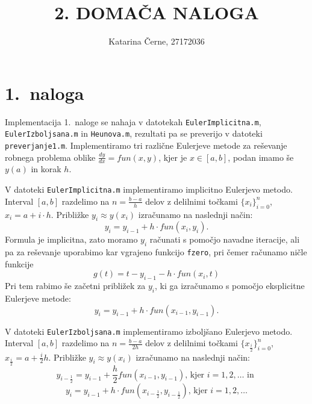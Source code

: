 \documentclass[a4paper,12pt]{article}
\begin{document}
\title{2. DOMAČA NALOGA}
\author{Katarina Černe, 27172036}
\maketitle

\section*{1.\ naloga}

Implementacija 1.\ naloge se nahaja v datotekah \texttt{EulerImplicitna.m}, \texttt{EulerIzboljsana.m} in \texttt{Heunova.m}, rezultati pa se preverijo v datoteki \texttt{preverjanje1.m}.
Implementiramo tri različne Eulerjeve metode za reševanje robnega problema oblike 
\(\frac{dy}{dx}=fun(x,y)\), kjer je \(x\in [a,b]\), podan imamo še \(y(a)\) in korak \(h\).

V datoteki \texttt{EulerImplicitna.m} implementiramo implicitno Eulerjevo metodo.
Interval \([a,b]\) razdelimo na \(n=\frac{b-a}{h}\) delov z delilnimi
točkami \(\{x_i\}_{i=0}^{n}\), \(x_i=a+i\cdot h\). Približke \(y_i\approx y(x_i)\)
izračunamo na naslednji način: 
\[y_i=y_{i-1}+h\cdot fun(x_i,y_i).\]
Formula je implicitna, zato moramo $y_i$ računati s pomočjo navadne
iteracije, ali pa za reševanje uporabimo kar vgrajeno funkcijo \texttt{fzero},
pri čemer računamo ničle funkcije 
$$g(t)=t-y_{i-1}-h\cdot fun(x_i,t)$$
Pri tem rabimo še začetni približek za $y_i$, ki ga
izračunamo s pomočjo eksplicitne Eulerjeve metode:
$$y_i=y_{i-1}+h\cdot fun(x_{i-1},y_{i-1}).$$

V datoteki \texttt{EulerIzboljsana.m} implementiramo izboljšano
Eulerjevo metodo. Interval $[a,b]$ razdelimo na $n=\frac{b-a}{2h}$
delov z delilnimi točkami $\{x_{\frac{i}{2}}\}_{i=0}^n$,
$x_{\frac{i}{2}}=a+\frac{i}{2}h$.  Približke \(y_i\approx y(x_i)\)
izračunamo na naslednji način:
$$y_{i-\frac{1}{2}}=y_{i-1}+\frac{h}{2}fun(x_{i-1},y_{i-1})\textrm{, kjer }
i=1,2,\ldots \textrm{ in }$$
$$y_i = y_{i-1} + h \cdot fun(x_{i-\frac{1}{2}},y_{i-\frac{1}{2}})\textrm{, kjer }
i=1,2,\ldots$$
\end{document}

